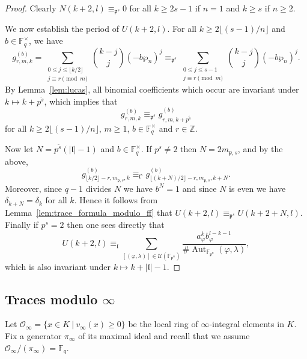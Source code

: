 \documentclass[10pt]{article}
\theoremstyle{definition}
\let\phi\varphi
\DeclareMathOperator\Aut{Aut}
\renewcommand{\:}{\colon}
\renewcommand{\l}{\mathfrak{l}}
\begin{document}
\begin{proof}
    Clearly $N(k+2,l) \equiv_{\mathfrak p^s} 0$ for all $k \geq 2s-1$ if $n=1$ and $k \geq s$ if $n \geq 2$.

    We now establish the period of $U(k+2,l)$. For all $k \geq 2\lfloor (s-1)/n \rfloor$ and $b \in \mathbb F_q^\times$, we have
    \[
    g^{(b)}_{r,m,k} = \sum_{\substack{0 \leq j \leq \lfloor k/2 \rfloor \\ j \equiv r \pmod{m}}} \binom{k-j}{j} (-b\wp_n)^j \equiv_{\mathfrak p^s} \sum_{\substack{0 \leq j \leq s-1 \\ j \equiv r \pmod{m}}} \binom{k-j}{j} (-b\wp_n)^j.
    \]
    By Lemma~\ref{lem:lucas}, 
    all binomial coefficients which occur are invariant under $k \mapsto k + p^{\tilde{s}}$, which implies that 
    \[
    g^{(b)}_{r,m,k} \equiv_{\mathfrak p^s} g^{(b)}_{r,m,k+p^{\tilde s}}
    \]
    for all $k \geq 2\lfloor (s-1)/n \rfloor$, $m \geq 1$, $b \in \mathbb F_q^\times$ and $r \in \mathbb Z$.

    Now let $N = p^{\tilde{s}}(|\l|-1)$ and $b \in \mathbb F_q^\times$. If $p^s \neq 2$ then $N = 2m_{\mathfrak p,s}$, and by the above,
    \[
    g^{(b)}_{\lfloor k/2 \rfloor - r,m_{\mathfrak p,s},k} \equiv_{\l^s} g^{(b)}_{\lfloor (k+N)/2 \rfloor - r,m_{\mathfrak p,s},k+N}.
    \]
    Moreover, since $q-1$ divides $N$ we have $b^N = 1$ and since $N$ is even we have $\delta_{k+N} = \delta_k$ for all $k$. Hence it follows from Lemma~\ref{lem:trace_formula_modulo_ff} that $U(k+2,l) \equiv_{\mathfrak p^s} U(k+2+N,l)$. Finally if $p^s = 2$ then one sees directly that
    \[
    U(k+2,l) \equiv_{\l} \sum_{[(\phi,\lambda)] \in \mathcal U(\mathbb F_{\mathfrak p^n})} \frac{a_{\phi}^{k}b_{\phi}^{l-k-1}}{\# \Aut_{\mathbb F_{\mathfrak p^n}}(\phi,\lambda)},
    \]
    which is also invariant under $k \mapsto k + |\l|-1$.
\end{proof}

\subsection{Traces modulo \texorpdfstring{$\infty$}{infty}}
Let $\mathcal O_\infty = \{x \in K \ | \ v_\infty(x) \geq 0\}$ be the local ring of $\infty$-integral elements in $K$. Fix a generator $\pi_\infty$ of its maximal ideal and recall that we assume $\mathcal O_\infty / (\pi_\infty) = \mathbb F_q$.
\end{document}
